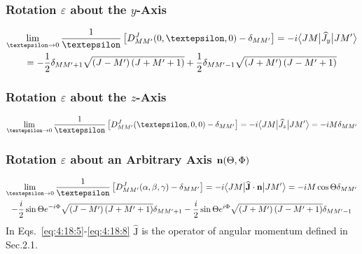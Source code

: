 \subsubsection{ Rotation $\varepsilon$ about the $y$-Axis}
\begin{gather}
\lim _{\varepsilon \rightarrow 0} \frac{1}{\varepsilon}\left[D_{M M^{\prime}}^{J}(0, \varepsilon, 0)-\delta_{M M^{\prime}}\right]=-i\braOket{J M}{\widehat{J}_{y}}{J M^{\prime}}  \notag\\
=-\frac{1}{2} \delta_{M M^{\prime}+1} \sqrt{\left(J-M^{\prime}\right)\left(J+M^{\prime}+1\right)}+\frac{1}{2} \delta_{M M^{\prime}-1} \sqrt{\left(J+M^{\prime}\right)\left(J-M^{\prime}+1\right)} \label{eq:4:18:6}
\end{gather}
\subsubsection{ Rotation $\varepsilon$ about the $z$-Axis}
\begin{equation}
\lim _{\varepsilon \rightarrow 0} \frac{1}{\varepsilon}\left[D_{M M^{\prime}}^{J}(\varepsilon, 0,0)-\delta_{M M^{\prime}}\right]=-i\braOket{J M}{\widehat{J}_{z}}{J M^{\prime}}=-i M \delta_{M M^{\prime}} \label{eq:4:18:7}
\end{equation}
\subsubsection{ Rotation $\varepsilon$ about an Arbitrary Axis $\mathbf{n}(\Theta, \Phi)$}
\begin{gather}
\lim _{\varepsilon \rightarrow 0} \frac{1}{\varepsilon}\left[D_{M M^{\prime}}^{J}(\alpha, \beta, \gamma)-\delta_{M M^{\prime}}\right]=-i\braOket{J M}{\widehat{\vect{J}} \cdot \vect{n}}{J M^{\prime}}=-i M \cos \Theta \delta_{M M^{\prime}}  \notag\\
-\frac{i}{2} \sin \Theta e^{-i \Phi} \sqrt{\left(J-M^{\prime}\right)\left(J+M^{\prime}+1\right)} \delta_{M M^{\prime}+1}-\frac{i}{2} \sin \Theta e^{i \Phi} \sqrt{\left(J+M^{\prime}\right)\left(J-M^{\prime}+1\right)} \delta_{M M^{\prime}-1} \label{eq:4:18:8}
\end{gather}
In Eqs.~\eqref{eq:4:18:5}-\eqref{eq:4:18:8} $\widehat{\mathrm{J}}$ is the operator of angular momentum defined in Sec.2.1.


